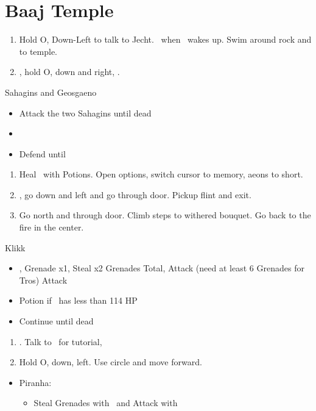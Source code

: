 \chapter{Baaj Temple}

\begin{enumerate}
    \item Hold O, Down-Left to talk to Jecht. \sd\ when \tidus\ wakes up. Swim around rock and to temple.
    \item \cs, hold O, down and right, \cs.
\end{enumerate}
\begin{battle}{Sahagins and Geosgaeno}
    \begin{itemize}
        \item Attack the two Sahagins until dead
        \item \cs[0:30]
        \item Defend until \cs
    \end{itemize}
\end{battle}
\begin{enumerate}[resume]
    \item Heal \tidus\ with Potions. Open options, switch cursor to memory, aeons to short.
    \item \cs, go down and left and go through door. Pickup flint and exit.
    \item Go north and through door. Climb steps to withered bouquet. Go back to the fire in the center. \cs[2:10]
\end{enumerate}
\begin{battle}[1500]{Klikk}
    \begin{itemize}
        \tidusf Attack x6, Potion once \tidus\ has less than 227 HP
        \item \cs, \sd
        \rikkuf Grenade x1, Steal x2 Grenades Total, Attack (need at least 6 Grenades for Tros)
        \tidusf Attack
        \item Potion if \tidus\ has less than 114 HP
        \item Continue until dead
    \end{itemize}
\end{battle}
\begin{enumerate}[resume]
    \item \cs[2:30]. Talk to \rikku\ for tutorial, \sd
    \item Hold O, down, left. Use circle and move forward.
\end{enumerate}
\begin{encounters}
    \begin{itemize}
        \item Piranha:
        \begin{itemize}
            \item Steal Grenades with \rikku\ and Attack with \tidus
        \end{itemize}
    \end{itemize}
\end{encounters}
